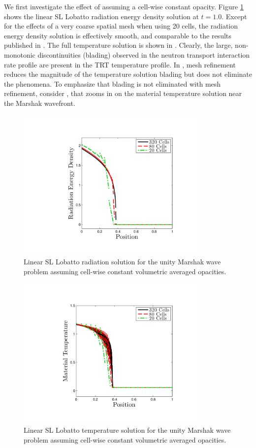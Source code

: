 We first investigate the effect of assuming a cell-wise constant opacity.  
Figure \ref{fig:bladed_rad_profile} shows the linear SL Lobatto radiation energy density solution at $t=1.0$.
Except for the effects of a very coarse spatial mesh when using 20 cells, the radiation energy density solution is effectively smooth, and comparable to the results published in \cite{ober_shadid}.  
The full temperature solution is shown in .
Clearly, the large, non-monotonic discontinuities (blading) observed in the neutron transport interaction rate profile are present in the TRT temperature profile.
In , mesh refinement reduces the magnitude of the temperature solution blading but does not eliminate the phenomena.
To emphasize that blading is not eliminated with mesh refinement, consider , that zooms in on the material temperature solution near the Marshak wavefront.
\begin{figure}[!htp]
\centering
\includegraphics[width=9.5cm,trim=1.2in  0.2in 0.75in 0.5in,clip=true]{chapter6_grey_radtran/Dissertation_Data/Reorder_Blading_Radiation_Full_MultiCell.pdf}
\caption{Linear SL Lobatto radiation solution for the unity Marshak wave problem assuming cell-wise constant volumetric averaged opacities.}
\label{fig:bladed_rad_profile}
\end{figure}
%
%
\begin{figure}[!hbp]
\centering
\includegraphics[width=9.5cm,trim=1.2in  0.2in 0.75in 0.5in,clip=true]{chapter6_grey_radtran/Dissertation_Data/Reorder_Blading_Temperature_Full_MultiCell.pdf}
\caption{Linear SL Lobatto temperature solution for the unity Marshak wave problem assuming cell-wise constant volumetric averaged opacities.}
\label{fig:bladed_t_profile_full}
\end{figure}
